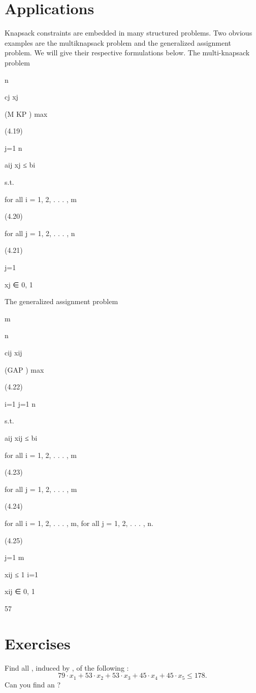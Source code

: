 \section{Applications}

Knapsack constraints are embedded in many structured problems. Two obvious examples are the multiknapsack problem and the generalized assignment problem. We will give their respective formulations
below.
The multi-knapsack problem

n

cj xj

(M KP ) max

(4.19)

j=1
n

aij xj ≤ bi

s.t.

for all i = 1, 2, . . . , m

(4.20)

for all j = 1, 2, . . . , n

(4.21)

j=1

xj ∈ {0, 1}

The generalized assignment problem

m

n

cij xij

(GAP ) max

(4.22)

i=1 j=1
n

s.t.

aij xij ≤ bi

for all i = 1, 2, . . . , m

(4.23)

for all j = 1, 2, . . . , m

(4.24)

for all i = 1, 2, . . . , m, for all j = 1, 2, . . . , n.

(4.25)

j=1
m

xij ≤ 1
i=1

xij ∈ {0, 1}

57

\section*{Exercises}
\begin{exercise}
Find all , induced by , of the following :
\begin{equation}
79\cdot x_1+53\cdot x_2+53\cdot x_3+45\cdot x_4+45\cdot x_5\leq178.
\end{equation}
Can you find an ?
\end{exercise}

